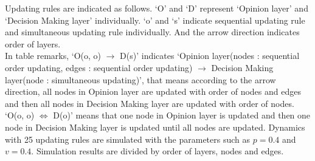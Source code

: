 Updating rules are indicated as follows. `O' and `D'  represent `Opinion layer' and `Decision Making layer' individually. `o' and `s' indicate sequential updating rule and simultaneous updating rule individually. And the arrow direction indicates order of layers.\\
In table remarks, `O(o, o) $\to$ D(s)' indicates `Opinion layer(nodes : sequential order updating, edges : sequential order updating) $\to$ Decision Making layer(node : simultaneous updating)', that means according to the arrow direction, all nodes in Opinion layer are updated with order of nodes and edges and then all nodes in Decision Making layer are updated with order of nodes. `O(o, o) $\Leftrightarrow$ D(o)' means that one node in Opinion layer is updated and then one node in Decision Making layer is updated until all nodes are updated. Dynamics with 25 updating rules are simulated with the parameters such as $p=0.4$ and $v=0.4$. Simulation results are divided by order of layers, nodes and edges. \\

